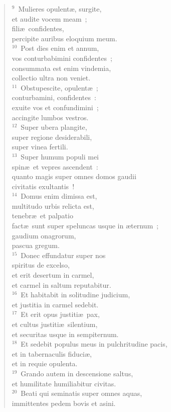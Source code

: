 \begin{flushleft}\begin{verse}${}^{9}$~Mulieres opulent\ae , surgite,\\ et audite vocem meam~;\\ fili\ae\ confidentes,\\ percipite auribus eloquium meum.\\
${}^{10}$~Post dies enim et annum,\\ vos conturbabimini confidentes~;\\ consummata est enim vindemia,\\ collectio ultra non veniet.\\
${}^{11}$~Obstupescite, opulent\ae~;\\ conturbamini, confidentes~:\\ exuite vos et confundimini~;\\ accingite lumbos vestros.\\
${}^{12}$~Super ubera plangite,\\ super regione desiderabili,\\ super vinea fertili.\\
${}^{13}$~Super humum populi mei\\ spin\ae\ et vepres ascendent~:\\ quanto magis super omnes domos gaudii\\ civitatis exultantis~!\\
${}^{14}$~Domus enim dimissa est,\\ multitudo urbis relicta est,\\ tenebr\ae\ et palpatio\\ fact\ae\ sunt super speluncas usque in \ae ternum~;\\ gaudium onagrorum,\\ pascua gregum.\\
${}^{15}$~Donec effundatur super nos\\ spiritus de excelso,\\ et erit desertum in carmel,\\ et carmel in saltum reputabitur.\\
${}^{16}$~Et habitabit in solitudine judicium,\\ et justitia in carmel sedebit.\\
${}^{17}$~Et erit opus justiti\ae\ pax,\\ et cultus justiti\ae\ silentium,\\ et securitas usque in sempiternum.\\
${}^{18}$~Et sedebit populus meus in pulchritudine pacis,\\ et in tabernaculis fiduci\ae ,\\ et in requie opulenta.\\
${}^{19}$~Grando autem in descensione saltus,\\ et humilitate humiliabitur civitas.\\
${}^{20}$~Beati qui seminatis super omnes aquas,\\ immittentes pedem bovis et asini.\end{verse}\end{flushleft}


